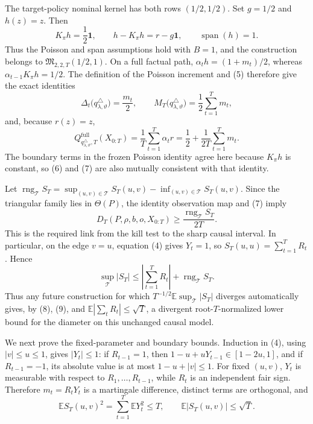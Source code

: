 The target-policy nominal kernel has both rows \((1/2,1/2)\).  Set \(g=1/2\) and \(h(z)=z\).  Then
\[
 K_{\pi}h=\frac12\mathbf 1,\qquad
 h-K_{\pi}h=r-g\mathbf 1,\qquad
 \operatorname{span}(h)=1.
 \tag{5}
\]
Thus the Poisson and span assumptions hold with \(B=1\), and the construction belongs to \(\mathfrak M_{2,2,T}(1/2,1)\).  On a full factual path, \(\alpha_t h=(1+m_t)/2\), whereas \(\alpha_{t-1}K_{\pi}h=1/2\).  The definition of the Poisson increment and (5) therefore give the exact identities
\[
 \Delta_t\bigl(q^{\triangle}_{\lambda,\vartheta}\bigr)=\frac{m_t}{2},
 \qquad
 M_T\bigl(q^{\triangle}_{\lambda,\vartheta}\bigr)=\frac12\sum_{t=1}^Tm_t,
 \tag{6}
\]
and, because \(r(z)=z\),
\[
 Q^{\mathrm{full}}_{q^{\triangle}_{\lambda,\vartheta},T}(X_{0:T})
 =\frac1T\sum_{t=1}^T\alpha_t r
 =\frac12+\frac1{2T}\sum_{t=1}^Tm_t.
 \tag{7}
\]
The boundary terms in the frozen Poisson identity agree here because \(K_{\pi}h\) is constant, so (6) and (7) are also mutually consistent with that identity.

Let \(\operatorname{rng}_{\mathcal T}S_T=\sup_{(u,v)\in\mathcal T}S_T(u,v)-\inf_{(u,v)\in\mathcal T}S_T(u,v)\).  Since the triangular family lies in \(\Theta(P)\), the identity observation map and (7) imply
\[
 D_T(P,\rho,b,o,X_{0:T})
 \geq \frac{\operatorname{rng}_{\mathcal T}S_T}{2T}.
 \tag{8}
\]
This is the required link from the kill test to the sharp causal interval.  In particular, on the edge \(v=u\), equation (4) gives \(Y_t=1\), so \(S_T(u,u)=\sum_{t=1}^TR_t\).  Hence
\[
 \sup_{\mathcal T}|S_T|
 \leq\left|\sum_{t=1}^TR_t\right|+\operatorname{rng}_{\mathcal T}S_T.
 \tag{9}
\]
Thus any future construction for which \(T^{-1/2}\mathbb E\sup_{\mathcal T}|S_T|\) diverges automatically gives, by (8), (9), and \(\mathbb E|\sum_tR_t|\leq\sqrt T\), a divergent root-\(T\)-normalized lower bound for the diameter on this unchanged causal model.

We next prove the fixed-parameter and boundary bounds.  Induction in (4), using \(|v|\leq u\leq1\), gives \(|Y_t|\leq1\): if \(R_{t-1}=1\), then \(1-u+uY_{t-1}\in[1-2u,1]\), and if \(R_{t-1}=-1\), its absolute value is at most \(1-u+|v|\leq1\).  For fixed \((u,v)\), \(Y_t\) is measurable with respect to \(R_1,\ldots,R_{t-1}\), while \(R_t\) is an independent fair sign.  Therefore \(m_t=R_tY_t\) is a martingale difference, distinct terms are orthogonal, and
\[
 \mathbb E S_T(u,v)^2=\sum_{t=1}^T\mathbb EY_t^2\leq T,
 \qquad
 \mathbb E|S_T(u,v)|\leq\sqrt T.
 \tag{10}
\]

